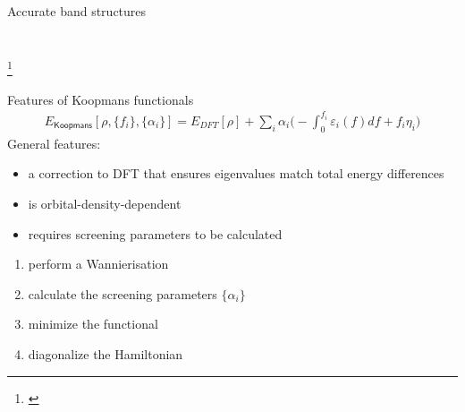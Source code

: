\documentclass[xcolor=table,aspectratio=169]{beamer}
\newcommand\blfootcite[1]{%
  \begingroup
  \renewcommand\thefootnote{}\footnote{\hspace{-4ex}\cite{#1}}%
  \addtocounter{footnote}{-1}%
  \endgroup
}
\numberwithin{equation}{section}
\begin{document}
\begin{frame}{Accurate band structures}
\begin{columns}
\begin{column}{0.5\textwidth}
{         }
      \end{column}
      \begin{column}{0.5\textwidth}
         \begin{center}
         \end{center}
      \end{column}
   \end{columns}
   \blfootcite{Nguyen2018}

\end{frame}

\begin{frame}{Features of Koopmans functionals}
   \begin{align*}
      E_\mathsf{Koopmans}[\rho,{\{f_i\}}, {\{\alpha_i\}}]
      = {E_{DFT}[\rho]}
      + \sum_i
      {\alpha_i}
      \Biggl(
      -
      {\int^{f_i}_{0} \varepsilon_i(f) df}
      +
      {f_i {\eta_i}}
      \Biggr)
   \end{align*}
   General features:
   \begin{itemize}[<+(1)->]
      \item a correction to DFT that ensures eigenvalues match total energy differences
      \item is orbital-density-dependent
      \item requires screening parameters to be calculated
   \end{itemize}

   \begin{enumerate}[<+(2)->]
      \item perform a Wannierisation
      \item calculate the screening parameters $\{\alpha_i\}$
      \item minimize the functional
      \item diagonalize the Hamiltonian
   \end{enumerate}

\end{frame}
\end{document}
